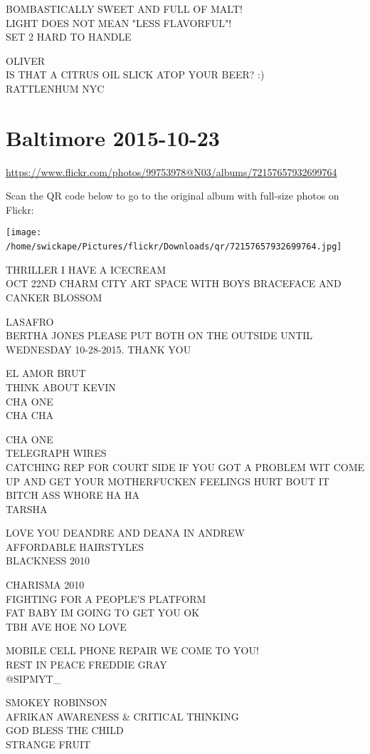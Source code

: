\documentclass[10pt,letterpaper]{article}
\begin{document}
BOMBASTICALLY SWEET AND FULL OF MALT!\\
LIGHT DOES NOT MEAN "LESS FLAVORFUL"!\\
SET 2 HARD TO HANDLE

OLIVER\\
IS THAT A CITRUS OIL SLICK ATOP YOUR BEER? :)\\
RATTLENHUM NYC
\

\section*{Baltimore 2015-10-23}

\url{https://www.flickr.com/photos/99753978@N03/albums/72157657932699764}

Scan the QR code below to go to the original album with full-size photos on Flickr:

\texttt{[image: /home/swickape/Pictures/flickr/Downloads/qr/72157657932699764.jpg]}
\

THRILLER I HAVE A ICECREAM\\
OCT 22ND CHARM CITY ART SPACE WITH BOYS BRACEFACE AND CANKER BLOSSOM

LASAFRO\\
BERTHA JONES PLEASE PUT BOTH ON THE OUTSIDE UNTIL WEDNESDAY 10{-}28{-}2015.  THANK YOU

EL AMOR BRUT\\
THINK ABOUT KEVIN\\
CHA ONE\\
CHA CHA

CHA ONE\\
TELEGRAPH WIRES\\
CATCHING REP FOR COURT SIDE IF YOU GOT A PROBLEM WIT COME UP AND GET YOUR MOTHERFUCKEN FEELINGS HURT BOUT IT BITCH ASS WHORE HA HA\\
TARSHA

LOVE YOU DEANDRE AND DEANA IN ANDREW\\
AFFORDABLE HAIRSTYLES\\
BLACKNESS 2010

CHARISMA 2010\\
FIGHTING FOR A PEOPLE'S PLATFORM\\
FAT BABY IM GOING TO GET YOU OK\\
TBH AVE HOE NO LOVE

MOBILE CELL PHONE REPAIR WE COME TO YOU!\\
REST IN PEACE FREDDIE GRAY\\
@SIPMYT\_

SMOKEY ROBINSON\\
AFRIKAN AWARENESS \& CRITICAL THINKING\\
GOD BLESS THE CHILD\\
STRANGE FRUIT
\end{document}
